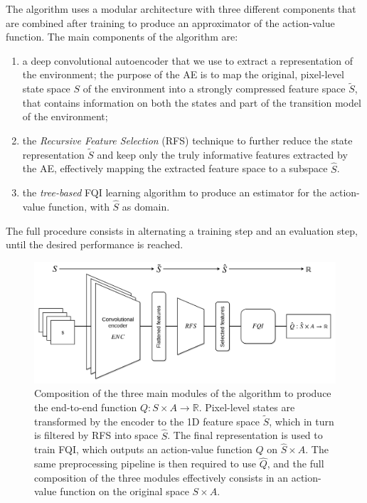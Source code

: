 The algorithm uses a modular architecture with three different components that 
are combined after training to produce an approximator of the action-value 
function. The main components of the algorithm are:
%
\begin{enumerate}
    \item a deep convolutional autoencoder that we use to extract a 
    representation of the environment;
    the purpose of the AE is to map the original, pixel-level state space $S$ of
    the environment into a strongly compressed feature space ${\tilde{S}}$, 
    that contains information on both the states and part of the transition 
    model of the environment;
    \item the \textit{Recursive Feature Selection} (RFS) technique to further 
    reduce the state representation $\tilde{S}$ and keep only the truly 
    informative features extracted by the AE, effectively mapping the extracted 
    feature space to a subspace $\hat{S}$.
    \item the \textit{tree-based} FQI learning algorithm to produce an 
    estimator for the action-value function, with $\hat{S}$ as domain. 
\end{enumerate}
%
The full procedure consists in alternating a training step and an evaluation 
step, until the desired performance is reached.
%
\begin{figure}
\includegraphics[width=\textwidth]{pictures/full_pipeline}
\centering
\caption[Schematic view of the three main modules]{Composition of the three main
						   modules of the algorithm to
						   produce the end-to-end 
						   function 
						   $Q: S \times A \rightarrow \mathbb{R}$.
						   Pixel-level states are transformed by the
						   encoder to the 1D feature space $\tilde{S}$,
						   which in turn is filtered by RFS into space 
						   $\hat{S}$. The final representation is 
						   used to train FQI, which outputs an 
						   action-value function $\hat{Q}$ on 
						   $\hat{S} \times A$. 
						   The same preprocessing pipeline is then
						   required to use $\hat{Q}$, and the full 
						   composition of the three modules effectively
						   consists in an action-value function on 
						   the original space $S \times A$.}
\label{f:full_pipeline}
\end{figure}
%

